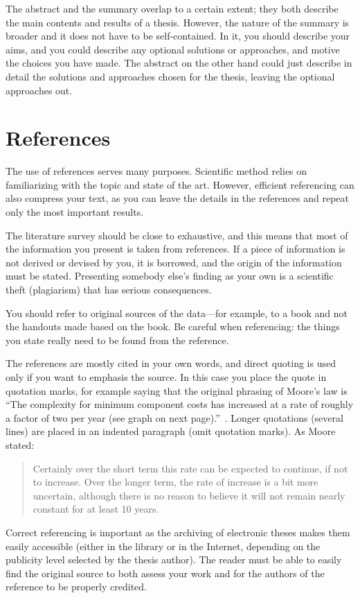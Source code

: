 The abstract and the summary overlap to a certain extent; they both describe the main contents and results of a thesis. However, the nature of the summary is broader and it does not have to be self-contained. In it, you should describe your aims, and you could describe any optional solutions or approaches, and motive the choices you have made. The abstract on the other hand could just describe in detail the solutions and approaches chosen for the thesis, leaving the optional approaches out.

\section{References}

The use of references serves many purposes. Scientific method relies on familiarizing with the topic and state of the art. However, efficient referencing can also compress your text, as you can leave the details in the references and repeat only the most important results.

The literature survey should be close to exhaustive, and this means that most of the information you present is taken from references. If a piece of information is not derived or devised by you, it is borrowed, and the origin of the information must be stated. Presenting somebody else’s finding as your own is a scientific theft (plagiarism) that has serious consequences.

You should refer to original sources of the data---for example, to a book and not the handouts made based on the book. Be careful when referencing: the things you state really need to be found from the reference.

The references are mostly cited in your own words, and direct quoting is used only if you want to emphasis the source. In this case you place the quote in quotation marks, for example saying that the original phrasing of Moore’s law is  ``The complexity for minimum component costs has increased at a rate of roughly a factor of two per year (see graph on next page).''~\cite{moore}. Longer
quotations (several lines) are placed in an indented paragraph (omit quotation marks). As Moore stated:
\begin{quote}
Certainly over the short term this rate can be expected to continue, if not to increase. Over the longer term, the rate of increase is a bit more uncertain, although there is no reason to believe it will not remain nearly constant for at least 10 years.~\cite{moore}
\end{quote}
Correct referencing is important as the archiving of electronic theses makes them easily accessible (either in the library or in the Internet, depending on the publicity level selected by the thesis author). The reader must be able
to easily find the original source to both assess your work and for the
authors of the reference to be properly credited.

